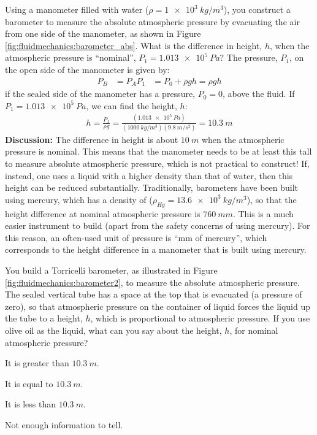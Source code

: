 {{\begin{example}{Using a manometer filled with water ($\rho=\SI{1e3}{kg/m^3}$), you construct a barometer to measure the absolute atmospheric pressure by evacuating the air from one side of the manometer, as shown in Figure \ref{fig:fluidmechanics:barometer_abs}. What is the difference in height, $h$, when the atmospheric pressure is ``nominal'', $P_1=\SI{1.013e5}{Pa}$?}
The pressure, $P_1$, on the open side of the manometer is given by:
\begin{align*}
P_B &= P_A
P_1&= P_0 + \rho g h = \rho g h
\end{align*}
if the sealed side of the manometer has a pressure, $P_0=0$, above the fluid. If $P_1=\SI{1.013e5}{Pa}$, we can find the height, $h$:
\begin{align*}
h=\frac{P_1}{\rho g}=\frac{(\SI{1.013e5}{Pa})}{(\SI{1000}{kg/m^3})(\SI{9.8}{m/s^2})}=\SI{10.3}{m}
\end{align*}
\textbf{Discussion: }The difference in height is about $\SI{10}{m}$ when the atmospheric pressure is nominal. This means that the manometer needs to be at least this tall to measure absolute atmospheric pressure, which is not practical to construct! If, instead, one uses a liquid with a higher density than that of water, then this height can be reduced substantially. Traditionally, barometers have been built using mercury, which has a density of ($\rho_{Hg}=\SI{13.6e3}{kg/m^3}$), so that the height difference at nominal atmospheric pressure is $\SI{760}{mm}$. This is a much easier instrument to build (apart from the safety concerns of using mercury). For this reason, an often-used unit of pressure is ``mm of mercury'', which corresponds to the height difference in a manometer that is built using mercury. 
\end{example}

\begin{checkpoint}
\begin{MCquestion}{You build a Torricelli barometer, as illustrated in Figure \ref{fig:fluidmechanics:barometer2}, to measure the absolute atmospheric pressure. The sealed vertical tube has a space at the top that is evacuated (a pressure of zero), so that atmospheric pressure on the container of liquid forces the liquid up the tube to a height, $h$, which is proportional to atmospheric pressure. If you use olive oil as the liquid, what can you say about the height, $h$, for nominal atmospheric pressure?}
\item It is greater than $\SI{10.3}{m}$.\correct
\item It is equal to $\SI{10.3}{m}$.
\item It is less than $\SI{10.3}{m}$.
\item Not enough information to tell.
\end{MCquestion}
\end{checkpoint}

}}
